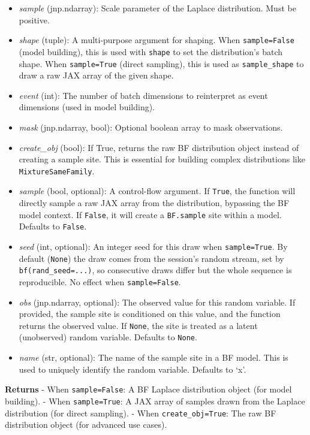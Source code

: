 \documentclass[
  letterpaper,
  DIV=11,
  numbers=noendperiod]{scrartcl}
\begin{document}
\begin{itemize}
\item
  \emph{sample} (jnp.ndarray): Scale parameter of the Laplace
  distribution. Must be positive.
\item
  \emph{shape} (tuple): A multi-purpose argument for shaping. When
  \texttt{sample=False} (model building), this is used with
  \texttt{shape} to set the distribution's batch shape. When
  \texttt{sample=True} (direct sampling), this is used as
  \texttt{sample\_shape} to draw a raw JAX array of the given shape.
\item
  \emph{event} (int): The number of batch dimensions to reinterpret as
  event dimensions (used in model building).
\item
  \emph{mask} (jnp.ndarray, bool): Optional boolean array to mask
  observations.
\item
  \emph{create\_obj} (bool): If True, returns the raw BF distribution
  object instead of creating a sample site. This is essential for
  building complex distributions like \texttt{MixtureSameFamily}.
\item
  \emph{sample} (bool, optional): A control-flow argument. If
  \texttt{True}, the function will directly sample a raw JAX array from
  the distribution, bypassing the BF model context. If \texttt{False},
  it will create a \texttt{BF.sample} site within a model. Defaults to
  \texttt{False}.
\item
  \emph{seed} (int, optional): An integer seed for this draw when
  \texttt{sample=True}. By default (\texttt{None}) the draw comes from
  the session's random stream, set by \texttt{bf(rand\_seed=...)}, so
  consecutive draws differ but the whole sequence is reproducible. No
  effect when \texttt{sample=False}.
\item
  \emph{obs} (jnp.ndarray, optional): The observed value for this random
  variable. If provided, the sample site is conditioned on this value,
  and the function returns the observed value. If \texttt{None}, the
  site is treated as a latent (unobserved) random variable. Defaults to
  \texttt{None}.
\item
  \emph{name} (str, optional): The name of the sample site in a BF
  model. This is used to uniquely identify the random variable. Defaults
  to `x'.
\end{itemize}

\textbf{Returns} - When \texttt{sample=False}: A BF Laplace distribution
object (for model building). - When \texttt{sample=True}: A JAX array of
samples drawn from the Laplace distribution (for direct sampling). -
When \texttt{create\_obj=True}: The raw BF distribution object (for
advanced use cases).
\end{document}
